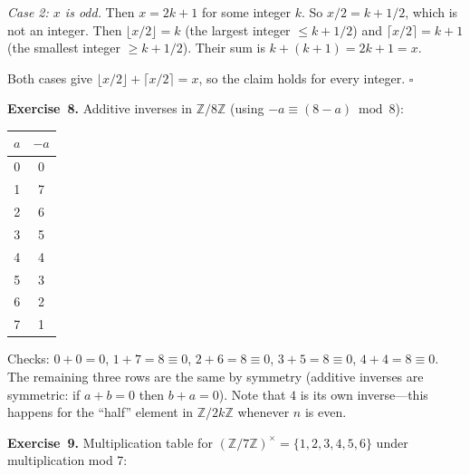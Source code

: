 \documentclass[11pt]{article}
\begin{document}
\emph{Case 2: $x$ is odd.} Then $x = 2k + 1$ for some integer $k$. So $x/2 = k + 1/2$, which is not an integer. Then $\lfloor x/2 \rfloor = k$ (the largest integer $\leq k + 1/2$) and $\lceil x/2 \rceil = k + 1$ (the smallest integer $\geq k + 1/2$). Their sum is $k + (k + 1) = 2k + 1 = x$. \checkmark

Both cases give $\lfloor x/2 \rfloor + \lceil x/2 \rceil = x$, so the claim holds for every integer. \hfill$\square$

\medskip
\textbf{Exercise~8.}
Additive inverses in $\mathbb{Z}/8\mathbb{Z}$ (using $-a \equiv (8 - a) \bmod 8$):

\begin{center}
\begin{tabular}{c|c}
\toprule
$a$ & $-a$ \\
\midrule
0 & 0 \\
1 & 7 \\
2 & 6 \\
3 & 5 \\
4 & 4 \\
5 & 3 \\
6 & 2 \\
7 & 1 \\
\bottomrule
\end{tabular}
\end{center}
Checks: $0 + 0 = 0$, $1 + 7 = 8 \equiv 0$, $2 + 6 = 8 \equiv 0$, $3 + 5 = 8 \equiv 0$, $4 + 4 = 8 \equiv 0$. The remaining three rows are the same by symmetry (additive inverses are symmetric: if $a + b = 0$ then $b + a = 0$). Note that $4$ is its own inverse---this happens for the ``half'' element in $\mathbb{Z}/2k\mathbb{Z}$ whenever $n$ is even.

\medskip
\textbf{Exercise~9.}
Multiplication table for $(\mathbb{Z}/7\mathbb{Z})^{\times} = \{1, 2, 3, 4, 5, 6\}$ under multiplication mod 7:
\end{document}
